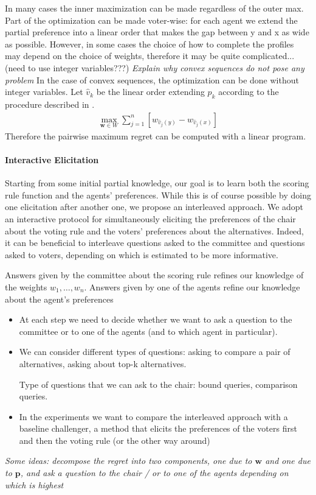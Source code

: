 \documentclass[12pt]{article}
\newcommand{\pprofile}{\textbf{p}}%
\newcommand{\w}{\textbf{w}}%
\begin{document}
In many cases the inner maximization can be made regardless of the outer max.
Part of the optimization can be made voter-wise: for each agent we extend the partial preference into a linear order that makes the gap between y and x as wide as possible.
However, in some cases the choice of how to complete the profiles may depend on the choice of weights, therefore it may be quite complicated...  (need to use integer variables???)
\medskip
 {\em Explain why convex sequences do not pose any problem}
In the case of convex sequences, the optimization can be done without integer variables.
Let $\hat{v}_k$ be the linear order extending $p_k$ according to the procedure described in \cite{Lu2011}.
\begin{align*}
\max_{\w \in W} \sum_{j=1}^{n}  [w_{\hat{v}_j(y)} - w_{\hat{v}_j(x)}]
\end{align*}
Therefore the pairwise maximum regret can be computed with a linear program.


\paragraph{Interactive Elicitation}
Starting from some initial partial knowledge, our goal is to learn both the scoring rule function and the agents' preferences.
While this is of course possible by doing one elicitation after another one, we propose an interleaved approach.
We adopt an interactive  protocol for simultaneously eliciting the preferences of the chair about the voting rule and the voters' preferences about the alternatives.
Indeed, it can be beneficial to interleave questions asked to the committee and questions asked to voters, depending on which is estimated to be more informative.

Answers given by the committee about the scoring rule refines our knowledge of the weights $w_1,\ldots,w_n$.
Answers given by one of the agents refine our knowledge about the agent's preferences

\begin{itemize}
\item At each step we need to decide whether we want to ask a question to the committee or to one of the agents (and to which agent in particular). 


\item We can consider different types of questions: asking to compare a pair of alternatives, asking about top-k alternatives.

Type of questions that we can ask to the chair:
bound queries, comparison queries.

\item In the experiments we want to compare the interleaved approach with a baseline challenger, a method  that elicits the preferences of the voters first and then the voting rule (or the other way around)
\end{itemize}

{\em Some ideas: decompose the regret into two components, one due to $\w$ and one due to $\pprofile$, and ask a question to the chair / or to one of the agents depending on which is highest}



 
\end{document}
